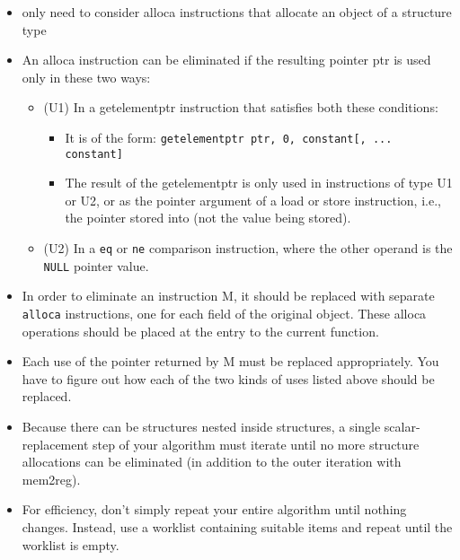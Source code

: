 \begin{itemize}
\item only need to consider alloca instructions that allocate an object of a structure type
\item An alloca instruction can be eliminated if the resulting pointer ptr is used only in these two ways:
\begin{itemize}
    \item (U1) In a getelementptr instruction that satisfies both these conditions:
    \begin{itemize}
        \item It is of the form: \lstinline|getelementptr ptr, 0, constant[, ... constant]|
        \item The result of the getelementptr is only used in instructions of type U1 or U2, or as the pointer
        argument of a load or store instruction, i.e., the pointer stored into (not the value being stored).

    \end{itemize}  
    \item (U2) In a \lstinline|eq| or \lstinline|ne| comparison instruction, where the other operand is the \lstinline|NULL| pointer value.
\end{itemize}    

\item In order to eliminate an instruction M, it should be replaced with separate \lstinline|alloca| instructions, one for each
field of the original object. These alloca operations should be placed at the entry to the current function.

\item Each use of the pointer returned by M must be replaced appropriately. You have to figure out how each of
the two kinds of uses listed above should be replaced.

\item Because there can be structures nested inside structures, a single scalar-replacement step of your algorithm
must iterate until no more structure allocations can be eliminated (in addition to the outer iteration with
mem2reg).

\item For efficiency, don’t simply repeat your entire algorithm until nothing changes. Instead, use a
worklist containing suitable items and repeat until the worklist is empty.


\end{itemize}    




